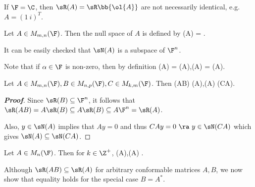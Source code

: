 \begin{remark}
If $\F = \C$, then $\sR(A) = \sR\bb{\ol{A}}$ are not necessarily identical, e.g. $A = (1 \ i )^T$.
\end{remark}




\begin{definition}
Let $A\in M_{m,n}(\F)$. Then the null space of $A$ is defined by
\be
\sN(A) = .
\ee

It can be easily checked that $\sN(A)$ is a subspace of $\F^n$.
\end{definition}

\begin{remark}
Note that if $\alpha\in \F$ is non-zero, then by definition
\be
\sR(\alpha A) = \sR(A),\qquad \sN(\alpha A) = \sN(A).
\ee
\end{remark}

\begin{lemma}\label{lem:range_null_space_product}
Let $A\in M_{m,n}(\F), B\in M_{n,p}(\F), C\in M_{k,m}(\F)$. Then
\be
\sR(AB) \subseteq \sR(A),\qquad \sN(A) \subseteq \sN(CA).
\ee
\end{lemma}

\begin{proof}[\bf Proof]
Since $\sR(B)\subseteq \F^n$, it follows that $\sR(AB) =A \sR(B) \subseteq A\sR(B) \subseteq A\F^n = \sR(A)$.

Also, $y\in \sN(A)$ implies that $Ay = 0$ and thus $CAy = 0 \ \ra\ y\in \sN(CA)$ which gives $\sN(A) \subseteq \sN(CA)$.
\end{proof}

\begin{corollary}
Let $A\in M_n(\F)$. Then for $k\in \Z^+$,
\be
\sR{} \subseteq \sR(A),\qquad \sN(A) \subseteq \sN{}.
\ee
\end{corollary}


Although $\sR(AB)\subseteq \sR(A)$ for arbitrary conformable matrices $A,B$, we now show that equality holds for the special case $B = A^*$.

